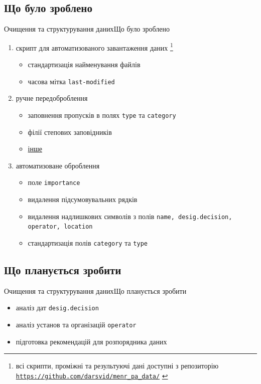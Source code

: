 \documentclass[12pt, aspectratio=1610]{beamer}
\newcommand{\chref}[2]{%
  \href{#1}{{\usebeamercolor[bg]{Aalborg}#2}}%
}
\newcommand\blfootnote[1]{%
	\begingroup
	\renewcommand\thefootnote{}\footnote{#1}%
	\addtocounter{footnote}{-1}%
	\endgroup
}
\begin{document}
\subsection{Що було зроблено}
\begin{frame}{Очищення та структурування даних}{Що було зроблено}
		\begin{enumerate}
			\item скрипт для автоматизованого завантаження даних\blfootnote{\tiny{всі скрипти, проміжні та результуючі дані доступні з репозиторію  \chref{https://github.com/darsvid/menr_pa_data/}{\texttt{https://github.com/darsvid/menr\_pa\_data/}}}}
			\begin{itemize}
				\item стандартизація найменування файлів
				\item часова мітка \texttt{last-modified}
			\end{itemize}
			\item ручне передоброблення
			\begin{itemize}
				\item заповнення пропусків в полях \texttt{type} та \texttt{category}
				\item філії степових заповідників
				\item \href{https://github.com/darsvid/menr_pa_data/blob/master/messy_data_01/readme.md}{інше}
			\end{itemize}
			\item автоматизоване оброблення
			\begin{itemize}
				\item поле \texttt{importance}
				\item видалення підсумовувальних рядків
				\item видалення надлишкових символів з полів \texttt{name, desig.decision, operator, location}
				\item стандартизація полів \texttt{category} та \texttt{type}
			\end{itemize}
		\end{enumerate}
\end{frame}

\subsection{Що планується зробити}
\begin{frame}{Очищення та структурування даних}{Що планується зробити}
	\begin{itemize}
		\item аналіз дат \texttt{desig.decision}
		\item аналіз установ та організацій \texttt{operator}
		\item підготовка рекомендацій для розпорядника даних
	\end{itemize}
\end{frame}
\end{document}
